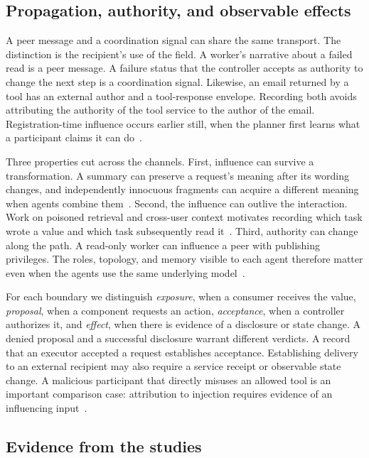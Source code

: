 \documentclass[11pt]{article}
\begin{document}
\subsection{Propagation, authority, and observable effects}

A peer message and a coordination signal can share the same transport. The distinction is the recipient's use of the field. A worker's narrative about a failed read is a peer message. A failure status that the controller accepts as authority to change the next step is a coordination signal. Likewise, an email returned by a tool has an external author and a tool-response envelope. Recording both avoids attributing the authority of the tool service to the author of the email. Registration-time influence occurs earlier still, when the planner first learns what a participant claims it can do~\citep{Yu2026MisleadingTPO}.

Three properties cut across the channels. First, influence can survive a transformation. A summary can preserve a request's meaning after its wording changes, and independently innocuous fragments can acquire a different meaning when agents combine them~\citep{lee2024promptinfection,arif2026conjunctive}. Second, the influence can outlive the interaction. Work on poisoned retrieval and cross-user context motivates recording which task wrote a value and which task subsequently read it~\citep{Chen2024AgentPoisonRLBS,Patlan2025CrossUserPUAK}. Third, authority can change along the path. A read-only worker can influence a peer with publishing privileges. The roles, topology, and memory visible to each agent therefore matter even when the agents use the same underlying model~\citep{hagag2026architecture,naik2026omnileak}.

For each boundary we distinguish \emph{exposure}, when a consumer receives the value, \emph{proposal}, when a component requests an action, \emph{acceptance}, when a controller authorizes it, and \emph{effect}, when there is evidence of a disclosure or state change. A denied proposal and a successful disclosure warrant different verdicts. A record that an executor accepted a request establishes acceptance. Establishing delivery to an external recipient may also require a service receipt or observable state change. A malicious participant that directly misuses an allowed tool is an important comparison case: attribution to injection requires evidence of an influencing input~\citep{kavathekar2025tamas}.

\subsection{Evidence from the studies}
\end{document}
